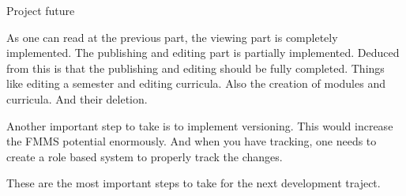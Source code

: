 Project future

As one can read at the previous part, the viewing part is completely implemented. The publishing and editing part is partially implemented. Deduced from this is that the publishing and editing should be fully completed. Things like editing a semester and editing curricula. Also the creation of modules and curricula. And their deletion.

Another important step to take is to implement versioning. This would increase the FMMS potential enormously. And when you have tracking, one needs to create a role based system to properly track the changes.

These are the most important steps to take for the next development traject.